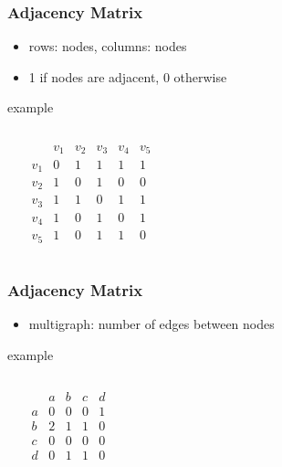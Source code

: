 \documentclass[dvipsnames]{beamer}
\begin{document}
\begin{frame}
  \frametitle{Adjacency Matrix}

  \begin{itemize}
    \item rows: nodes, columns: nodes
    \item 1 if nodes are adjacent, 0 otherwise
  \end{itemize}

  \begin{exampleblock}{example}
    \begin{columns}
      \begin{center}
      \end{center}

      \[
        \begin{array}{c|ccccc}
                & v_1 & v_2 & v_3 & v_4 & v_5\\\hline
            v_1 & 0 & 1 & 1 & 1 & 1\\
            v_2 & 1 & 0 & 1 & 0 & 0\\
            v_3 & 1 & 1 & 0 & 1 & 1\\
            v_4 & 1 & 0 & 1 & 0 & 1\\
            v_5 & 1 & 0 & 1 & 1 & 0
        \end{array}
      \]
    \end{columns}
  \end{exampleblock}
\end{frame}

\begin{frame}
  \frametitle{Adjacency Matrix}

  \begin{itemize}
    \item multigraph: number of edges between nodes
  \end{itemize}

  \begin{exampleblock}{example}
    \begin{columns}
    \begin{center}
    \end{center}

      \[
        \begin{array}{c|cccc}
              & a & b & c & d\\\hline
            a & 0 & 0 & 0 & 1\\
            b & 2 & 1 & 1 & 0\\
            c & 0 & 0 & 0 & 0\\
            d & 0 & 1 & 1 & 0
        \end{array}
      \]
    \end{columns}
  \end{exampleblock}
\end{frame}
\end{document}
